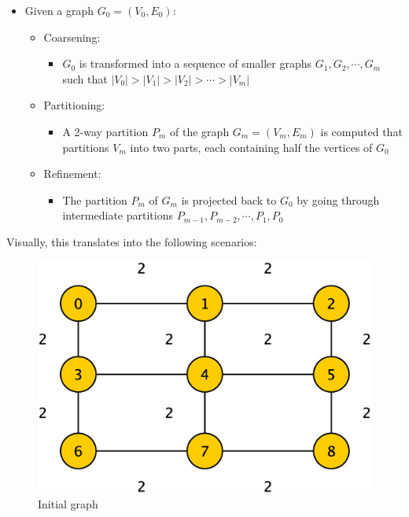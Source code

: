 \documentclass[abstract=on,9pt,twocolumn]{scrartcl}
\begin{document}
  \begin{itemize}
  \item Given a graph $G_0 = (V_0,E_0)$:
  \begin{itemize}    
    \item Coarsening:
    \begin{itemize}
      \item $G_0$ is transformed into a sequence of smaller graphs $G_1,G_2,\cdots,G_m$ such that $|V_0|>|V_1|>|V_2|>\cdots>|V_m|$
    \end{itemize}
    \item Partitioning: 
    \begin{itemize}
      \item A 2-way partition $P_m$ of the graph $G_m = (V_m,E_m)$ is computed that partitions $V_m$ into two parts, each containing half the vertices of $G_0$
    \end{itemize}
    \item Refinement:
    \begin{itemize}
      \item The partition $P_m$ of $G_m$ is projected back to $G_0$ by going through intermediate partitions $P_{m-1}, P_{m-2},\cdots,P_1,P_0$
    \end{itemize}
  \end{itemize}
\end{itemize}

Visually, this translates into the following scenarios:

\begin{center}
  \begin{figure}[H]
    \includegraphics[width=\columnwidth]{img/coarsening.eps}
    \caption{Initial graph}
    \label{img:init_graph}
  \end{figure} 
\end{center}
\end{document}
